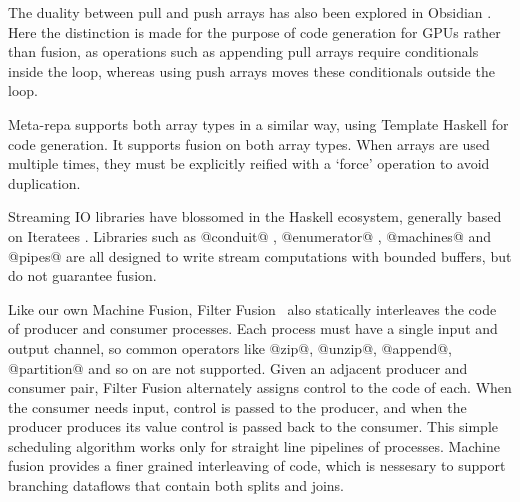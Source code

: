 
The duality between pull and push arrays has also been explored in Obsidian \cite{claessen2012expressive, svensson2014defunctionalizing}. Here the distinction is made for the purpose of code generation for GPUs rather than fusion, as operations such as appending pull arrays require conditionals inside the loop, whereas using push arrays moves these conditionals outside the loop.

Meta-repa \cite{ankner2013edsl} supports both array types in a similar way, using Template Haskell for code generation. It supports fusion on both array types. When arrays are used multiple times, they must be explicitly reified with a `force' operation to avoid duplication.


Streaming IO libraries have blossomed in the Haskell ecosystem, generally based on Iteratees \cite{kiselyov2012iteratees}. Libraries such as @conduit@ \cite{hackage:conduit}, @enumerator@ \cite{hackage:enumerator}, @machines@ \cite{hackage:machines} and @pipes@ \cite{hackage:pipes} are all designed to write stream computations with bounded buffers, but do not guarantee fusion.



Like our own Machine Fusion,  Filter Fusion~\cite{proebsting1996filter} also statically interleaves the code of producer and consumer processes. Each process must have a single input and output channel, so common operators like @zip@, @unzip@, @append@, @partition@ and so on are not supported. Given an adjacent producer and consumer pair, Filter Fusion alternately assigns control to the code of each. When the consumer needs input, control is passed to the producer, and when the producer produces its value control is passed back to the consumer. This simple scheduling algorithm works only for straight line pipelines of processes. Machine fusion provides a finer grained interleaving of code, which is nessesary to support branching dataflows that contain both splits and joins.

